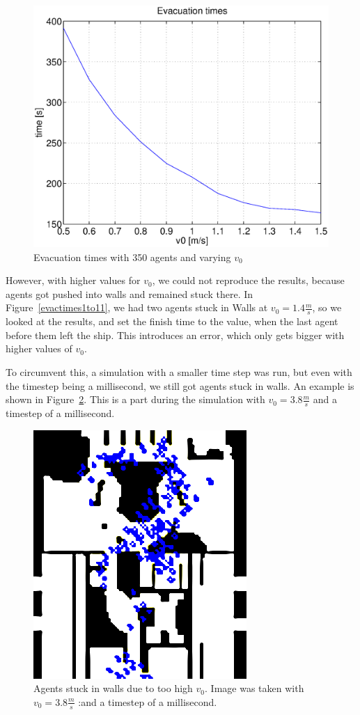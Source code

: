\documentclass[11pt]{article}
\begin{document}
\begin{figure}[h]
	\centering
	\includegraphics[scale=0.5]{images/evactimes23to33.eps}
	\caption{Evacuation times with 350 agents and varying \(v_0\) 	}
	\label{evactimes23to33}
\end{figure}

However, with higher values for \(v_0\), we could not reproduce the results, because
agents got pushed into walls and remained stuck there. In Figure~\ref{evactimes1to11},
we had two agents stuck in Walls at \(v_0 = 1.4\frac{m}{s}\), so we looked at the results,
and set the finish time to the value, when the last agent before them left
the ship. This introduces an error, which only gets bigger with higher values of \(v_0\).

To circumvent this, a simulation with a smaller time step was run, but even with the timestep 
being a millisecond, we still got agents stuck in walls. An example is shown in Figure~\ref{stuckinwall}. This is a part during the simulation with \(v_0 = 3.8\frac{m}{s}\) and a timestep of a millisecond.

\begin{figure}[h]
	\centering
	\includegraphics[scale=1]{images/StuckInWall.png}
	\caption{Agents stuck in walls due to too high \(v_0\). Image was taken with \(v_0=3.8\frac{m}{s}\) :and a timestep of a millisecond.}
	\label{stuckinwall}
\end{figure}
\end{document}
